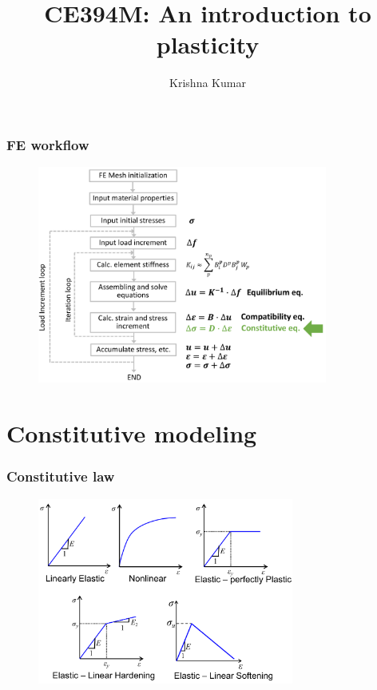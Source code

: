 \documentclass[handout]{beamer}
\title[CE394M: intro to plasticity]{CE394M: An introduction to plasticity}
\author{Krishna Kumar} %
\institute[UT Austin] %
{
University of Texas at Austin \\
\medskip
\textit{
  \url{krishnak@utexas.edu}} %
}
\date{} %
\begin{document}
\begin{frame}
\titlepage %
\end{frame}


\begin{frame}
	\frametitle{FE workflow}
	\begin{figure}
		\includegraphics[width=0.85\textwidth]{figs/fe-code.png}
		
	\end{figure}
\end{frame}
\section{Constitutive modeling}
\begin{frame}
\frametitle{Constitutive law}
\begin{figure}
	\includegraphics[width=0.75\textwidth]{figs/constitutive-law.png}
\end{figure}
\end{frame}
\end{document}
